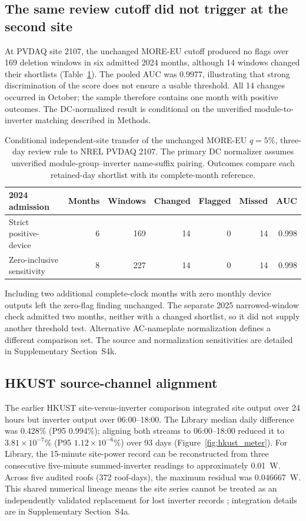 \documentclass[preprint,12pt]{elsarticle}
\begin{document}
\subsection{The same review cutoff did not trigger at the second site}
At PVDAQ site 2107, the unchanged MORE-EU cutoff produced no flags over 169 deletion windows in six admitted 2024 months, although 14 windows changed their shortlists (Table~\ref{tab:external_transfer}). The pooled AUC was 0.9977, illustrating that strong discrimination of the score does not ensure a usable threshold. All 14 changes occurred in October; the sample therefore contains one month with positive outcomes. The DC-normalized result is conditional on the unverified module-to-inverter matching described in Methods.

\begin{table}[htbp]
\centering
\caption{Conditional independent-site transfer of the unchanged MORE-EU $q=5\%$, three-day review rule to NREL PVDAQ 2107. The primary DC normalizer assumes unverified module-group--inverter name-suffix pairing. Outcomes compare each retained-day shortlist with its complete-month reference.}
\label{tab:external_transfer}
\footnotesize
\setlength{\tabcolsep}{5pt}
\begin{tabular}{lrrrrrr}
\toprule
2024 admission & Months & Windows & Changed & Flagged & Missed & AUC \\
\midrule
Strict positive-device & 6 & 169 & 14 & 0 & 14 & 0.998 \\
Zero-inclusive sensitivity & 8 & 227 & 14 & 0 & 14 & 0.998 \\
\bottomrule
\end{tabular}
\end{table}

Including two additional complete-clock months with zero monthly device outputs left the zero-flag finding unchanged. The separate 2025 narrowed-window check admitted two months, neither with a changed shortlist, so it did not supply another threshold test. Alternative AC-nameplate normalization defines a different comparison set. The source and normalization sensitivities are detailed in Supplementary Section~S4k.

\subsection{HKUST source-channel alignment}
The earlier HKUST site-versus-inverter comparison integrated site output over 24 hours but inverter output over 06:00--18:00. The Library median daily difference was 0.428\% (P95 0.994\%); aligning both streams to 06:00--18:00 reduced it to $3.81\times10^{-7}\%$ (P95 $1.12\times10^{-6}\%$) over 93 days (Figure~\ref{fig:hkust_meter}). For Library, the 15-minute site-power record can be reconstructed from three consecutive five-minute summed-inverter readings to approximately 0.01~W. Across five audited roofs (372 roof-days), the maximum residual was 0.046667~W. This shared numerical lineage means the site series cannot be treated as an independently validated replacement for lost inverter records \cite{ieat13measurement2018}; integration details are in Supplementary Section~S4a.
\end{document}
